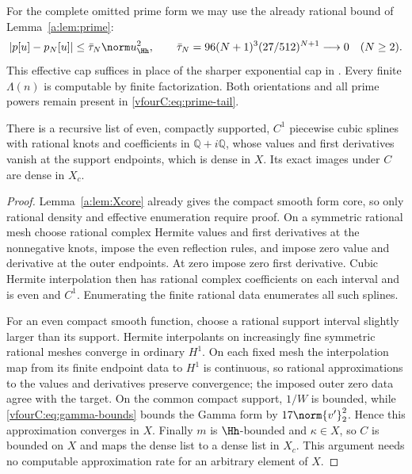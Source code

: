 For the complete omitted prime form we may use the already rational bound of
Lemma~\ref{a:lem:prime}:
\begin{equation}\label{vfourC:eq:prime-tail}
 |p[u]-p_N[u]|\le\bar\tau_N\norm u_{\Hh}^2,\qquad
 \bar\tau_N=96(N+1)^3(27/512)^{N+1}\longrightarrow0
 \quad(N\ge2).
\end{equation}
This effective cap suffices in place of the sharper exponential cap in
\cite{vfourComputable}.  Every finite $\Lambda(n)$ is computable by finite
factorization.  Both orientations and all prime powers remain present in
\eqref{vfourC:eq:prime-tail}.

\begin{lemma}
\label{vfourC:lem:core}
There is a recursive list of even, compactly supported, $C^1$ piecewise cubic
splines with rational knots and coefficients in $\mathbb Q+i\mathbb Q$, whose
values and first derivatives vanish at the support endpoints, which is dense in
$X$.  Its exact images under $C$ are dense in $X_c$.
\end{lemma}
\begin{proof}
Lemma~\ref{a:lem:Xcore} already gives the compact smooth form core, so only
rational density and effective enumeration require proof.  On a symmetric
rational mesh choose rational complex Hermite values and first derivatives at
the nonnegative knots, impose the even reflection rules, and impose zero value
and derivative at the outer endpoints.  At zero impose zero first derivative.
Cubic Hermite interpolation then has rational complex coefficients on each
interval and is even and $C^1$.  Enumerating the finite rational data enumerates
all such splines.

For an even compact smooth function, choose a rational support interval slightly
larger than its support.  Hermite interpolants on increasingly fine symmetric
rational meshes converge in ordinary $H^1$.  On each fixed mesh the interpolation
map from its finite endpoint data to $H^1$ is continuous, so rational
approximations to the values and derivatives preserve convergence; the imposed
outer zero data agree with the target.  On the common compact support,
$1/W$ is bounded, while \eqref{vfourC:eq:gamma-bounds} bounds the Gamma form by
$17\norm{v'}_2^2$.  Hence this approximation converges in $X$.  Finally $m$ is
$\Hh$-bounded and $\kappa\in X$, so $C$ is bounded on $X$ and maps the dense list
to a dense list in $X_c$.  This argument needs no computable approximation rate
for an arbitrary element of $X$.
\end{proof}


